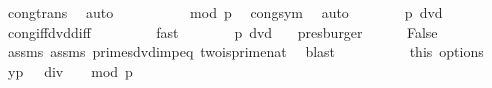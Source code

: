 \begin{isabellebody}
\ cong{\isacharunderscore}{\kern0pt}trans\ \isamarkupfalse%
\ auto\isanewline
\ \ \ \ \isamarkupfalse%
\ \isamarkupfalse%
\ {\isachardoublequoteopen}{\isacharbrackleft}{\kern0pt}{}\ {\isacharequal}{\kern0pt}\ {\isacharminus}{\kern0pt}{}{\isacharbrackright}{\kern0pt}\ {\isacharparenleft}{\kern0pt}mod\ p{\isacharparenright}{\kern0pt}{\isachardoublequoteclose}\ \isamarkupfalse%
\ cong{\isacharunderscore}{\kern0pt}sym\ \isamarkupfalse%
\ auto\isanewline
\ \ \ \ \isamarkupfalse%
\ \isamarkupfalse%
\ {\isachardoublequoteopen}p\ dvd\ {\isacharparenleft}{\kern0pt}{}\ {\isacharminus}{\kern0pt}\ {\isacharparenleft}{\kern0pt}{\isacharminus}{\kern0pt}{}{\isacharparenright}{\kern0pt}{\isacharparenright}{\kern0pt}{\isachardoublequoteclose}\ \isamarkupfalse%
\ cong{\isacharunderscore}{\kern0pt}iff{\isacharunderscore}{\kern0pt}dvd{\isacharunderscore}{\kern0pt}diff\ \isanewline
\ \ \ \ \ \ \isamarkupfalse%
\ fast\isanewline
\ \ \ \ \isamarkupfalse%
\ \isamarkupfalse%
\ {\isachardoublequoteopen}p\ dvd\ {}{\isachardoublequoteclose}\ \isamarkupfalse%
\ presburger\isanewline
\ \ \ \ \isamarkupfalse%
\ {\isachardoublequoteopen}False{\isachardoublequoteclose}\ \isanewline
\ \ \ \ \ \ \ \isamarkupfalse%
\ assms{\isacharparenleft}{\kern0pt}{}{\isacharparenright}{\kern0pt}\ assms{\isacharparenleft}{\kern0pt}{}{\isacharparenright}{\kern0pt}\ primes{\isacharunderscore}{\kern0pt}dvd{\isacharunderscore}{\kern0pt}imp{\isacharunderscore}{\kern0pt}eq\ two{\isacharunderscore}{\kern0pt}is{\isacharunderscore}{\kern0pt}prime{\isacharunderscore}{\kern0pt}nat\ \isamarkupfalse%
\ blast\isanewline
\ \ \isamarkupfalse%
\isanewline
\ \ \ \isanewline
\ \ \isamarkupfalse%
\ this\ options\ \isamarkupfalse%
\ {\isachardoublequoteopen}{\isacharbrackleft}{\kern0pt}{\isacharparenleft}{\kern0pt}y{\isacharcircum}{\kern0pt}{}{\isacharparenright}{\kern0pt}{\isacharcircum}{\kern0pt}{\isacharparenleft}{\kern0pt}{\isacharparenleft}{\kern0pt}p\ {\isacharminus}{\kern0pt}\ {}{\isacharparenright}{\kern0pt}\ div\ {}{\isacharparenright}{\kern0pt}\ {\isacharequal}{\kern0pt}\ {}{\isacharbrackright}{\kern0pt}\ {\isacharparenleft}{\kern0pt}mod\ p{\isacharparenright}{\kern0pt}{\isachardoublequoteclose}\ \isamarkupfalse%

\end{isabellebody}
